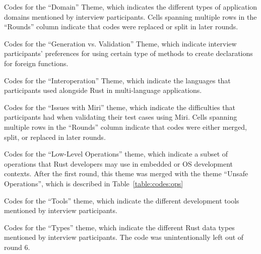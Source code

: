 \begin{table}
\caption{Codes for the ``Domain'' Theme, which indicates the different types of application domains mentioned by interview participants. Cells spanning multiple rows in the ``Rounds'' column indicate that codes were replaced or split in later rounds.}
\label{table:codes:domain}

\end{table}

\begin{table}
\caption{Codes for the ``Generation vs. Validation'' Theme, which indicate interview participants' preferences for using certain type of methods to create declarations for foreign functions.}
\label{table:codes:genvval}

\end{table}

\begin{table}
\caption{Codes for the ``Interoperation'' Theme, which indicate the languages that participants used alongside Rust in multi-language applications.}
\label{table:codes:interop}

\end{table}

\begin{table}
\caption{Codes for the ``Issues with Miri'' theme, which indicate the difficulties that participants had when validating their test cases using Miri. Cells spanning multiple rows in the ``Rounds'' column indicate that codes were either merged, split, or replaced in later rounds.}
\label{table:codes:miri}

\end{table}

\begin{table}
\caption{Codes for the ``Low-Level Operations'' theme, which indicate a subset of operations that Rust developers may use in embedded or OS development contexts. After the first round, this theme was merged with the theme ``Unsafe Operations'', which is described in Table~\ref{table:codes:ops}}
\label{table:codes:low_level}

\end{table}

\begin{table}
\caption{Codes for the ``Tools'' theme, which indicate the different development tools mentioned by interview participants.}
\label{table:codes:tools}

\end{table}

\begin{table}
\caption{Codes for the ``Types'' theme, which indicate the different Rust data types mentioned by interview participants. The code  was unintentionally left out of round 6.}
\label{table:codes:types}

\end{table}

